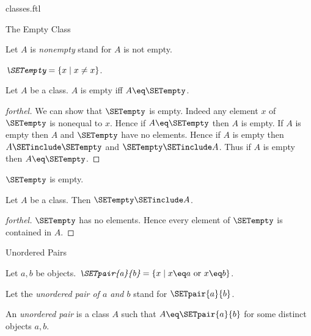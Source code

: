 \documentclass{stex}
\begin{document}
\begin{smodule}{classes.ftl}
\begin{sfragment}{The Empty Class}
\begin{definition}[forthel,id=FOUNDATIONS_01_6252477624090624]
    Let $A$ is \emph{nonempty} stand for $A$ is not empty.
  \end{definition}

  \begin{definition}[forthel,id=FOUNDATIONS_01_7939928493129728]
    $\emph{\SETempty} = \{ x \mid x \neq x \}$.
  \end{definition}

  \begin{proposition}[forthel,id=FOUNDATIONS_01_2263153161273344]
    Let $A$ be a class.
    $A$ is empty iff $A \eq \SETempty$.
  \end{proposition}
  \begin{proof}[forthel]
    We can show that $\SETempty$ is empty.
    Indeed any element $x$ of $\SETempty$ is nonequal to $x$.
    Hence if $A \eq \SETempty$ then $A$ is empty.
    If $A$ is empty then $A$ and $\SETempty$ have no elements.
    Hence if $A$ is empty then $A \SETinclude \SETempty$ and $\SETempty \SETinclude A$.
    Thus if $A$ is empty then $A \eq \SETempty$.
  \end{proof}

  \begin{corollary}[forthel,id=FOUNDATIONS_01_1495141426659328]
    $\SETempty$ is empty.
  \end{corollary}

  \begin{corollary}[forthel,id=FOUNDATIONS_01_6931785090859008]
    Let $A$ be a class.
    Then $\SETempty \SETinclude A$.
  \end{corollary}
  \begin{proof}[forthel]
    $\SETempty$ has no elements.
    Hence every element of $\SETempty$ is contained in $A$.
  \end{proof}
\end{sfragment}

\begin{sfragment}{Unordered Pairs}
  \begin{definition}[forthel,id=FOUNDATIONS_01_3471035364016128]
    Let $a, b$ be objects.
    $\emph{\SETpair{a}{b}} = \{ x \mid x \eq a\text{ or }x \eq b \}$.

    Let the \emph{unordered pair of $a$ and $b$} stand for $\SETpair{a}{b}$.
  \end{definition}

  \begin{definition}[forthel,id=FOUNDATIONS_01_605432672419840]
    An \emph{unordered pair} is a class $A$ such that $A \eq \SETpair{a}{b}$ for some distinct objects $a, b$.
  \end{definition}


\end{sfragment}
\end{smodule}
\end{document}
